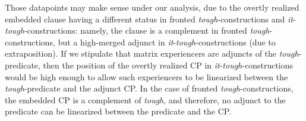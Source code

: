 \documentclass[11pt]{article}
\begin{document}
\iffalse\footnotetext{This has to be contrasted with \textit{for}-CP ellipsis, which cannot strand the \textit{for}+Dp complex:
\begin{exe}
	\ex[] {Mary wanted for Sue to win, but Bill needed for her *(to).}
\end{exe}}\fi
Those datapoints may make sense under our analysis, due to the overtly realized embedded clause having a different status in fronted \textit{tough}-constructions and \textit{it}-\textit{tough}-constructions: namely, the clause is a complement in fronted \textit{tough}-constructions, but a high-merged adjunct in \textit{it}-\textit{tough}-constructions (due to extraposition). 
If we stipulate that matrix experiencers are adjuncts of the \textit{tough}-predicate, then the position of the overtly realized CP in \textit{it}-\textit{tough}-constructions would be high enough to allow such experiencers to be linearized between the \textit{tough}-predicate and the adjunct CP. In the case of fronted \textit{tough}-constructions, the embedded CP is a complement of \textit{tough}, and therefore, no adjunct to the predicate can be linearized between the predicate and the CP.
\end{document}
